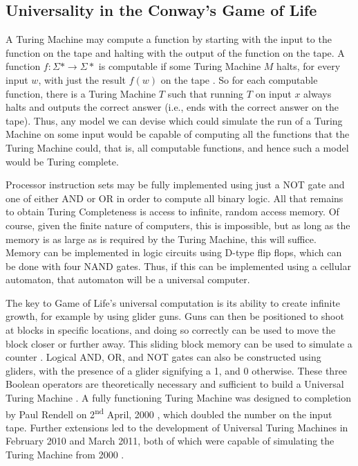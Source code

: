 \documentclass[11pt,a4paper]{article}
\begin{document}
    \subsection{Universality in the Conway's Game of Life}
    A Turing Machine may compute a function by starting with the input to the
    function on the tape and halting with the output of the function on the
    tape. A function $f : \Sigma \ast \rightarrow \Sigma \ast$ is computable if
    some Turing Machine $M$ halts, for every input $w$, with just the result
    $f(w)$ on the tape \cite{Computable}. So for each computable function, there
    is a Turing Machine $T$ such that running $T$ on input $x$ always halts and
    outputs the correct answer (i.e., ends with the correct answer on the tape).
    Thus, any model we can devise which could simulate the run of a Turing
    Machine on some input would be capable of computing all the functions that
    the Turing Machine could, that is, all computable functions, and hence such
    a model would be Turing complete.

    Processor instruction sets may be fully implemented using just a NOT gate
    and one of either AND or OR in order to compute all binary logic. All that
    remains to obtain Turing Completeness is access to infinite, random access
    memory. Of course, given the finite nature of computers, this is impossible,
    but as long as the memory is as large as is required by the Turing Machine,
    this will suffice. Memory can be implemented in logic circuits using D-type
    flip flops, which can be done with four NAND gates. Thus, if this can be
    implemented using a cellular automaton, that automaton will be a universal
    computer.

    The key to Game of Life's universal computation is its ability to create
    infinite growth, for example by using glider guns. Guns can then be
    positioned to shoot at blocks in specific locations, and doing so correctly
    can be used to move the block closer or further away. This sliding block
    memory can be used to simulate a counter \cite{Counter}. Logical AND, OR,
    and NOT gates can also be constructed using gliders, with the presence of a
    glider signifying a 1, and 0 otherwise. These three Boolean operators are
    theoretically necessary and sufficient to build a Universal Turing Machine
    \cite{BoolTM}. A fully functioning Turing Machine was designed to completion
    by Paul Rendell on 2\textsuperscript{nd} April, 2000 \cite{golTM}, which
    doubled the number on the input tape. Further extensions led to the
    development of Universal Turing Machines in February 2010 and March 2011,
    both of which were capable of simulating the Turing Machine from 2000
    \cite{golUTM1,golUTM2}.
\end{document}
